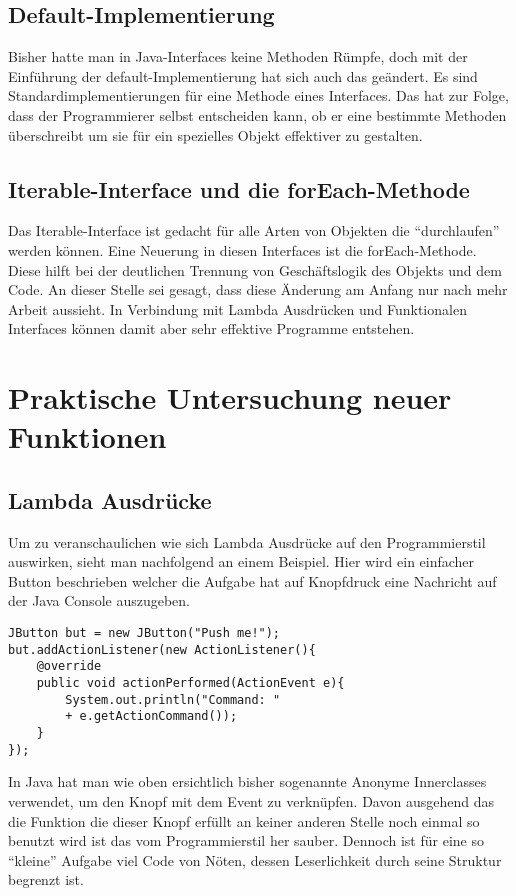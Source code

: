 \section{Default-Implementierung}
\label{sec:DI}
Bisher hatte man in Java-Interfaces keine Methoden Rümpfe, doch mit der
Einführung der default-Implementierung hat sich auch das geändert. Es sind
Standardimplementierungen für eine Methode eines Interfaces. Das hat zur Folge,
dass der Programmierer selbst entscheiden kann, ob er eine bestimmte Methoden
überschreibt um sie für ein spezielles Objekt effektiver zu gestalten.

\section{Iterable-Interface und die forEach-Methode}
\label{sec:IIufEM}
Das Iterable-Interface ist gedacht für alle Arten von Objekten die
"`durchlaufen"' werden können. Eine Neuerung in diesen Interfaces ist die
forEach-Methode. Diese hilft bei der deutlichen Trennung von Geschäftslogik des
Objekts und dem Code. An dieser Stelle sei gesagt, dass diese Änderung am Anfang
nur nach mehr Arbeit aussieht. In Verbindung mit Lambda Ausdrücken und
Funktionalen Interfaces können damit aber sehr effektive Programme entstehen. 


\chapter{Praktische Untersuchung neuer Funktionen}
\label{sec:Praxis}

\section{Lambda Ausdrücke}
\label{sec:Lambda}
Um zu veranschaulichen wie sich Lambda Ausdrücke auf den Programmierstil
auswirken, sieht man nachfolgend an einem Beispiel. Hier wird ein einfacher
Button beschrieben welcher die Aufgabe hat auf Knopfdruck eine Nachricht auf der
Java Console auszugeben.

\lstset{language=Java}  
\begin{lstlisting}
JButton but = new JButton("Push me!");
but.addActionListener(new ActionListener(){
	@override
	public void actionPerformed(ActionEvent e){
		System.out.println("Command: " 
		+ e.getActionCommand());
	}
});
\end{lstlisting}

In Java hat man wie oben ersichtlich bisher sogenannte Anonyme Innerclasses
verwendet, um den Knopf mit dem Event zu verknüpfen. Davon ausgehend das die
Funktion die dieser Knopf erfüllt an keiner anderen Stelle noch einmal so benutzt wird ist das vom Programmierstil her
sauber. Dennoch ist für eine so "`kleine"' Aufgabe viel Code von Nöten, dessen
Leserlichkeit durch seine Struktur begrenzt ist.

